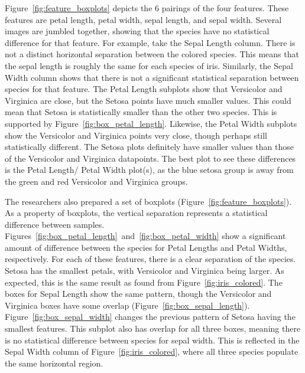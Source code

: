\documentclass{article}
\begin{document}
Figure~\ref{fig:feature_boxplots} depicts the 6 pairings of the four features. These features are petal length, petal width, sepal length, and sepal width. Several images are jumbled together, showing that the species have no statistical difference for that feature. For example, take the Sepal Length column. There is not a distinct horizontal separation between the colored species. This means that the sepal length is roughly the same for each species of iris. Similarly, the Sepal Width column shows that there is not a significant statistical separation between species for that feature.
The Petal Length subplots show that Versicolor and Virginica are close, but the Setosa points have much smaller values. This could mean that Setosa is statistically smaller than the other two species. This is supported by Figure~\ref{fig:box_petal_length}. Likewise, the Petal Width subplots show the Versicolor and Virginica points very close, though perhaps still statistically different. The Setosa plots definitely have smaller values than those of the Versicolor and Virginica datapoints. The best plot to see these differences is the Petal Length/ Petal Width plot(s), as the blue setosa group is away from the green and red Versicolor and Virginica groups.

The researchers also prepared a set of boxplots (Figure~\ref{fig:feature_boxplots}). As a property of boxplots, the vertical separation represents a statistical difference between samples. Figures~\ref{fig:box_petal_length}~and~\ref{fig:box_petal_width} show a significant amount of difference between the species for Petal Lengths and Petal Widths, respectively. For each of these features, there is a clear separation of the species. Setosa has the smallest petals, with Versicolor and Virginica being larger. As expected, this is the same result as found from Figure~\ref{fig:iris_colored}. The boxes for Sepal Length show the same pattern, though the Versicolor and Virginica boxes have some overlap (Figure~\ref{fig:box_sepal_length}). Figure~\ref{fig:box_sepal_width} changes the previous pattern of Setosa having the smallest features. This subplot also has overlap for all three boxes, meaning there is no statistical difference between species for sepal width. This is reflected in the Sepal Width column of Figure~\ref{fig:iris_colored}, where all three species populate the same horizontal region.
\end{document}
